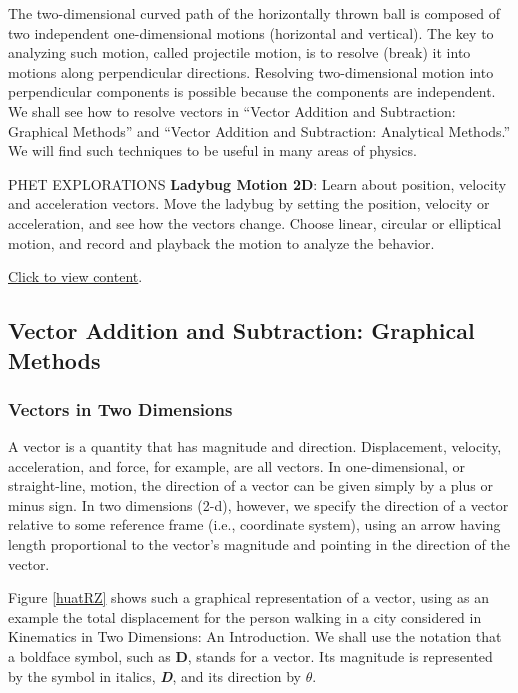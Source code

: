 \documentclass[../../main-ap-physics.tex]{subfiles}
\begin{document}
\vspace{1em}

The two-dimensional curved path of the horizontally thrown ball is composed of two independent one-dimensional motions (horizontal and vertical). The key to analyzing such motion, called projectile motion, is to resolve (break) it into motions along perpendicular directions. Resolving two-dimensional motion into perpendicular components is possible because the components are independent. We shall see how to resolve vectors in ``Vector Addition and Subtraction: Graphical Methods'' and ``Vector Addition and Subtraction: Analytical Methods.'' We will find such techniques to be useful in many areas of physics.

\begin{gradient}{PHET EXPLORATIONS}
    \textbf{Ladybug Motion 2D}: Learn about position, velocity and acceleration vectors. Move the ladybug by setting the position, velocity or acceleration, and see how the vectors change. Choose linear, circular or elliptical motion, and record and playback the motion to analyze the behavior.

    \vspace{1em}

    \href{https://openstax.org/l/28ladybugmotion}{Click to view content}.
\end{gradient}

\subsection{Vector Addition and Subtraction: Graphical Methods}

\subsubsection*{Vectors in Two Dimensions}

A \gls{vector} is a quantity that has magnitude and direction. Displacement, velocity, acceleration, and force, for example, are all vectors. In one-dimensional, or straight-line, motion, the direction of a vector can be given simply by a plus or minus sign. In two dimensions (2-d), however, we specify the direction of a vector relative to some reference frame (i.e., coordinate system), using an arrow having length proportional to the vector's magnitude and pointing in the direction of the vector.

\vspace{1em}
Figure \ref{huatRZ} shows such a graphical representation of a vector, using as an example the total displacement for the person walking in a city considered in Kinematics in Two Dimensions: An Introduction. We shall use the notation that a boldface symbol, such as $\mathbf{D}$, stands for a vector. Its magnitude is represented by the symbol in italics, \textbf{\textit{D}}, and its direction by $\theta$.
\end{document}
